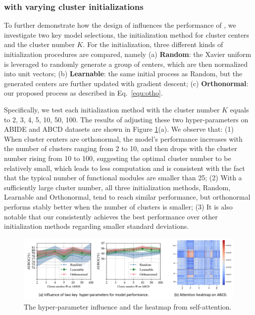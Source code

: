 \subsubsection{\poolingshort with varying cluster initializations}
To further demonstrate how the design of \poolingshort influences the performance of \methodtable, we investigate two key model selections, the initialization method for cluster centers and the cluster number $K$. For the initialization, three different kinds of initialization procedures are compared, namely (a) \textbf{Random}: the Xavier uniform \citep{glorot2010understanding} is leveraged to randomly generate a group of centers, which are then normalized into unit vectors; (b) \textbf{Learnable}: the same initial process as Random, but the generated centers are further updated with gradient descent; (c) \textbf{Orthonormal}: our proposed process as described in Eq.~\eqref{equ:otho}. 

Specifically, we test each initialization method with the cluster number $K$ equals to {2, 3, 4, 5, 10, 50, 100}. The results of adjusting these two hyper-parameters on ABIDE and ABCD datasets are shown in Figure \ref{fig:parameter}(a). We observe that: (1) When cluster centers are orthonormal, the model's performance increases with the number of clusters ranging from 2 to 10, and then drops with the cluster number rising from 10 to 100, suggesting the optimal cluster number to be relatively small, which leads to less computation and is consistent with the fact that the typical number of functional modules are smaller than 25; (2) With a sufficiently large cluster number, all three initialization methods, Random, Learnable and Orthonormal, tend to reach similar performance, but orthonormal performs stably better when the number of clusters is smaller; (3) It is also notable that our \poolingshort consistently achieves the best performance over other initialization methods regarding smaller standard deviations. 

\begin{figure}[h]
    \centering
    \includegraphics[width=0.90\linewidth]{figures/figure3.pdf}
    \caption{The hyper-parameter influence and the heatmap from self-attention.}
    \label{fig:parameter}
\end{figure}

